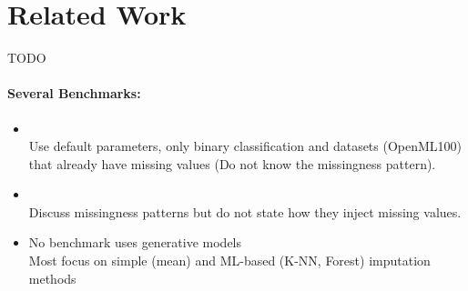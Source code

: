 \section{Related Work}

TODO


\paragraph{Several Benchmarks:}

\begin{itemize}
	\item \cite{Imputation_Benchmark} \hfill \\
		Use default parameters, only binary classification and datasets (OpenML100) that already have missing values (Do not know the missingness pattern).
%
	\item \cite{Imputation_Benchmark_2} \hfill \\
		Discuss missingness patterns but do not state how they inject missing values.

	\item No benchmark uses generative models \hfill \\
		Most focus on simple (mean) and ML-based (K-NN, Forest) imputation methods
\end{itemize}
